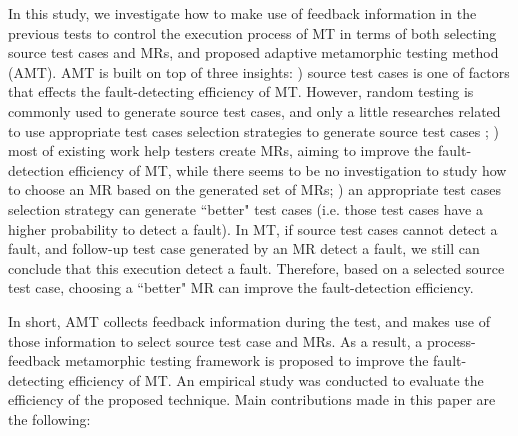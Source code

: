 \documentclass[10pt,journal,compsoc]{IEEEtran}
\newcommand{\rmnum}[1]{\expandafter{\romannumeral #1\relax}}
\begin{document}
In this study, we investigate how to make use of feedback information in the previous tests to control the execution process of MT in terms of both selecting source test cases and MRs, and proposed adaptive metamorphic testing method (AMT). AMT is built on top of three insights: \rmnum{1}) source test cases is one of factors that effects the fault-detecting efficiency of MT. However, random testing is commonly used to generate source test cases, and only a little researches related to use appropriate test cases selection strategies to generate source test cases \cite{segura2016survey}; \rmnum{2}) most of existing work help testers create MRs, aiming to improve the fault-detection efficiency of MT, while there seems to be no investigation to study how to choose an MR based on the generated set of MRs; \rmnum{3}) an appropriate test cases selection strategy can generate ``better" test cases (i.e. those test cases have a higher probability to detect a fault). In MT, if source test cases cannot detect a fault, and follow-up test case generated by an MR detect a fault, we still can conclude that this execution detect a fault. Therefore, based on a selected source test case, choosing a ``better" MR can improve the fault-detection efficiency.

In short, AMT collects feedback information during the test, and makes use of those information to select source test case and MRs.
As a result, a process-feedback metamorphic testing framework is proposed to improve the fault-detecting efficiency of MT. An empirical study was conducted to evaluate the efficiency of the proposed technique. Main contributions made in this paper are the following:
\end{document}
